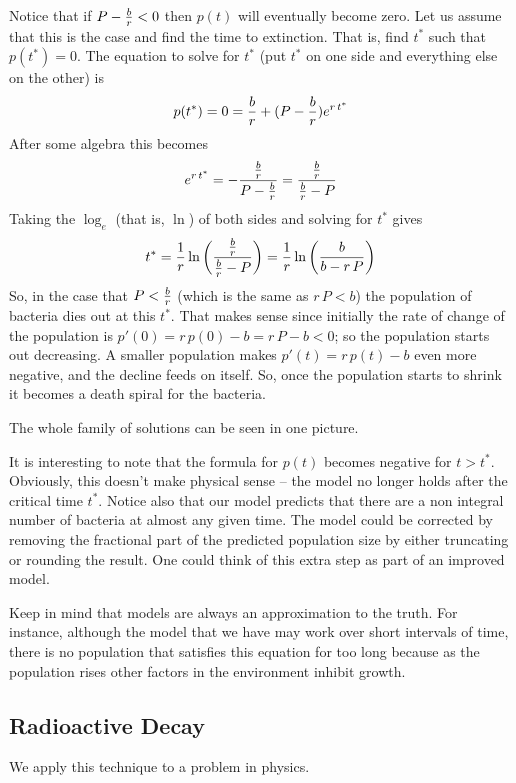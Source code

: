 Notice that if $P - {b \over r} < 0$ then $p(t)$ will eventually become zero. Let us assume that this 
is the case and find the time to extinction. That is, find $t^{*}$ such that $p(t^{*}) = 0$. The
equation to solve for $t^*$ (put $t^*$ on one side and everything else on the other) is
$$
p(t^*) = 0 = {b \over r} + (P - {b \over r}) e^{r \, t^*}
$$
After some algebra this becomes
$$
e^{r\, t^*} = - {{ b \over r} \over {P - {b \over r}}} = {{ b \over r} \over {{b \over r} - P}}
$$
Taking the $\log_e$ (that is, $\ln$) of both sides and solving for $t^*$ gives
$$
t^* = {1 \over r} \ln\bigg( {{ b \over r} \over {{b \over r} - P}}\bigg) =  {1 \over r} \ln\bigg( {b  \over {b - r \, P}}\bigg) 
$$
So, in the case that $P < {b \over r}$ (which is the same as $r \, P < b$) the population of bacteria dies out at this
$t^*$. That makes sense since initially the rate of change of the population is $p'(0) = r \, p(0) - b = r \, P - b < 0$;
so the population starts out decreasing. A smaller population makes
$p'(t) = r \, p(t) - b$ even more negative, and the decline feeds on itself.
So, once the population starts to shrink it becomes a death spiral for the bacteria.

The whole family of solutions can be seen in one picture.

It is interesting to note that the formula for $p(t)$ becomes negative for $t > t^*$. Obviously, this
doesn't make physical sense -- the model no longer holds after the critical time $t^*$.
Notice also that our model predicts that there are a non integral number of bacteria at almost any given time.
The model could be corrected by removing the fractional part of the predicted population size by either truncating or
rounding the result. One could think of this extra step as part of an improved model. 

Keep in mind that models are always
an approximation to the truth. For instance, although the model that we have may work over short intervals of time, there is
no population that satisfies this equation for too long because as the population rises other factors in the environment
inhibit growth.

\subsection{Radioactive Decay}
We apply this technique to a problem in physics.

